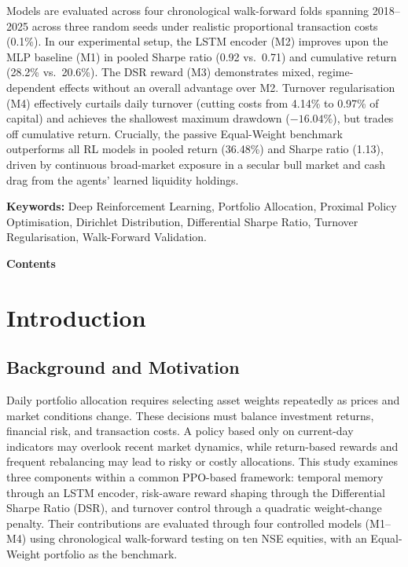 \documentclass[11pt,a4paper]{article}
\numberwithin{equation}{section}
\numberwithin{table}{section}
\numberwithin{figure}{section}
\numberwithin{algorithm}{section}
\begin{document}
Models are evaluated across four chronological walk-forward folds spanning 2018--2025 across three random seeds under realistic proportional transaction costs (0.1\%). In our experimental setup, the LSTM encoder (M2) improves upon the MLP baseline (M1) in pooled Sharpe ratio (0.92 vs.\ 0.71) and cumulative return (28.2\% vs.\ 20.6\%). The DSR reward (M3) demonstrates mixed, regime-dependent effects without an overall advantage over M2. Turnover regularisation (M4) effectively curtails daily turnover (cutting costs from 4.14\% to 0.97\% of capital) and achieves the shallowest maximum drawdown ($-16.04\%$), but trades off cumulative return. Crucially, the passive Equal-Weight benchmark outperforms all RL models in pooled return (36.48\%) and Sharpe ratio (1.13), driven by continuous broad-market exposure in a secular bull market and cash drag from the agents' learned liquidity holdings.

\textbf{Keywords:} Deep Reinforcement Learning, Portfolio Allocation, Proximal Policy Optimisation, Dirichlet Distribution, Differential Sharpe Ratio, Turnover Regularisation, Walk-Forward Validation.
\vspace{6pt}


{\large\bfseries Contents}\par\vspace{-8pt}
{\small\setcounter{tocdepth}{1}\tableofcontents}
\clearpage


\section{Introduction}\label{ch:intro}
\subsection{Background and Motivation}
Daily portfolio allocation requires selecting asset weights repeatedly as prices and market conditions change. These decisions must balance investment returns, financial risk, and transaction costs. A policy based only on current-day indicators may overlook recent market dynamics, while return-based rewards and frequent rebalancing may lead to risky or costly allocations. This study examines three components within a common PPO-based framework: temporal memory through an LSTM encoder, risk-aware reward shaping through the Differential Sharpe Ratio (DSR), and turnover control through a quadratic weight-change penalty. Their contributions are evaluated through four controlled models (M1--M4) using chronological walk-forward testing on ten NSE equities, with an Equal-Weight portfolio as the benchmark.
\end{document}
